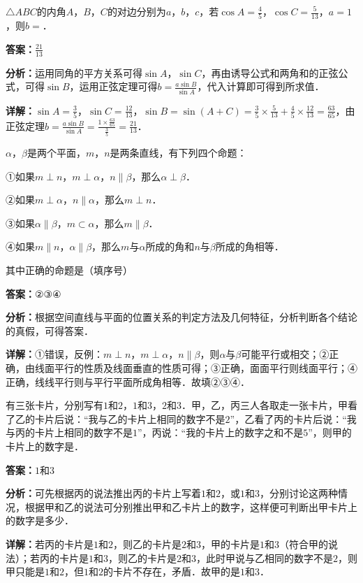 \begin{question}[points=5]
$\triangle ABC$的内角$A$，$B$，$C$的对边分别为$a$，$b$，$c$，若$\cos A=\frac{4}{5}$，$\cos C=\frac{5}{13}$，$a=1$，则$b=$．
\fillin[{$\frac{21}{13}$}]
\begin{solution}
\textbf{答案：}$\frac{21}{13}$

\textbf{分析：}运用同角的平方关系可得$\sin A$，$\sin C$，再由诱导公式和两角和的正弦公式，可得$\sin B$，运用正弦定理可得$b=\frac{a\sin B}{\sin A}$，代入计算即可得到所求值．

\textbf{详解：}$\sin A=\frac{3}{5}$，$\sin C=\frac{12}{13}$，$\sin B=\sin(A+C)=\frac{3}{5}\times\frac{5}{13}+\frac{4}{5}\times\frac{12}{13}=\frac{63}{65}$，由正弦定理$b=\frac{a\sin B}{\sin A}=\frac{1\times\frac{63}{65}}{\frac{3}{5}}=\frac{21}{13}$．
\end{solution}
\end{question}

\begin{question}[points=5]
$\alpha$，$\beta$是两个平面，$m$，$n$是两条直线，有下列四个命题：

①如果$m\perp n$，$m\perp\alpha$，$n\parallel\beta$，那么$\alpha\perp\beta$．

②如果$m\perp\alpha$，$n\parallel\alpha$，那么$m\perp n$．

③如果$\alpha\parallel\beta$，$m\subset\alpha$，那么$m\parallel\beta$．

④如果$m\parallel n$，$\alpha\parallel\beta$，那么$m$与$\alpha$所成的角和$n$与$\beta$所成的角相等．

其中正确的命题是（填序号）
\begin{solution}
\textbf{答案：}$\text{②③④}$

\textbf{分析：}根据空间直线与平面的位置关系的判定方法及几何特征，分析判断各个结论的真假，可得答案．

\textbf{详解：}①错误，反例：$m\perp n$，$m\perp\alpha$，$n\parallel\beta$，则$\alpha$与$\beta$可能平行或相交；②正确，由线面平行的性质及线面垂直的性质可得；③正确，面面平行则线面平行；④正确，线线平行则与平行平面所成角相等．故填②③④．
\end{solution}
\end{question}

\begin{question}[points=5]
有三张卡片，分别写有$1$和$2$，$1$和$3$，$2$和$3$．甲，乙，丙三人各取走一张卡片，甲看了乙的卡片后说：“我与乙的卡片上相同的数字不是$2$”，乙看了丙的卡片后说：“我与丙的卡片上相同的数字不是$1$”，丙说：“我的卡片上的数字之和不是$5$”，则甲的卡片上的数字是．
\fillin[{$1$和$3$}]
\begin{solution}
\textbf{答案：}$1$和$3$

\textbf{分析：}可先根据丙的说法推出丙的卡片上写着$1$和$2$，或$1$和$3$，分别讨论这两种情况，根据甲和乙的说法可分别推出甲和乙卡片上的数字，这样便可判断出甲卡片上的数字是多少．

\textbf{详解：}若丙的卡片是$1$和$2$，则乙的卡片是$2$和$3$，甲的卡片是$1$和$3$（符合甲的说法）；若丙的卡片是$1$和$3$，则乙的卡片是$2$和$3$，此时甲说与乙相同的数字不是$2$，则甲只能是$1$和$2$，但$1$和$2$的卡片不存在，矛盾．故甲的是$1$和$3$．
\end{solution}
\end{question}

